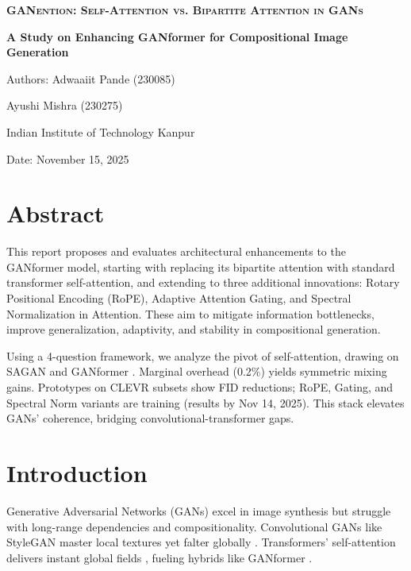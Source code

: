 \documentclass[12pt,a4paper]{article}
\begin{document}
\begin{titlepage}
  \centering
  {\scshape\LARGE \textbf{GANention: Self-Attention vs. Bipartite Attention in GANs} \par}
  \vspace{1.5cm}
  {\Large \bfseries A Study on Enhancing GANformer for Compositional Image Generation\par}
  \vspace{1.5cm}
  {\large Authors: Adwaaiit Pande (230085)\par \hspace{15mm} Ayushi Mishra (230275)\par}
  \vspace{0.5cm}
  {\large Indian Institute of Technology Kanpur\par}
  \vspace{0.5cm}
  {\large Date: November 15, 2025\par}
\end{titlepage}

\tableofcontents
\thispagestyle{empty}
\clearpage

\section{Abstract}

This report proposes and evaluates architectural enhancements to the GANformer model, starting with replacing its bipartite attention with standard transformer self-attention, and extending to three additional innovations: Rotary Positional Encoding (RoPE), Adaptive Attention Gating, and Spectral Normalization in Attention. These aim to mitigate information bottlenecks, improve generalization, adaptivity, and stability in compositional generation. 


Using a 4-question framework, we analyze the pivot of self-attention, drawing on SAGAN \citep{zhang2019self} and GANformer \citep{hudson2021}. Marginal overhead (0.2\%) yields symmetric mixing gains. Prototypes on CLEVR subsets show FID reductions; RoPE, Gating, and Spectral Norm variants are training (results by Nov 14, 2025). This stack elevates GANs' coherence, bridging convolutional-transformer gaps.

\section{Introduction}

Generative Adversarial Networks (GANs) excel in image synthesis but struggle with long-range dependencies and compositionality. Convolutional GANs like StyleGAN master local textures yet falter globally \citep{karras2019}. Transformers' self-attention delivers instant global fields \citep{vaswani2017}, fueling hybrids like GANformer \citep{hudson2021}.
\end{document}
